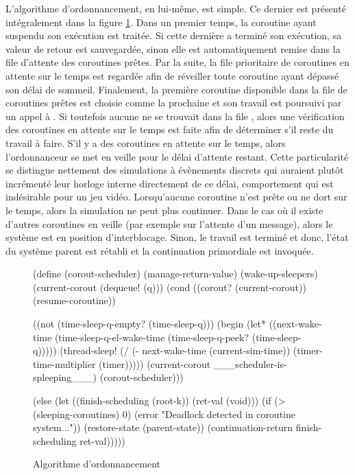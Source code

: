 \documentclass[12pt,twoside,letterpaper,francais]{book}
\newcommand{\scheme}[1]{\selectlanguage{english}{\tt #1}\selectlanguage{french}}
\begin{document}
L'algorithme d'ordonnancement, en lui-même, est simple. Ce dernier est
présenté intégralement dans la figure \ref{Corout:scheduler}. Dans un
premier temps, la coroutine ayant suspendu son exécution est
traitée. Si cette dernière a terminé son exécution, sa valeur de
retour est sauvegardée, sinon elle est automatiquement remise dans la
file d'attente des coroutines prêtes. Par la suite, la file
prioritaire de coroutines en attente sur le temps est regardée afin de
réveiller toute coroutine ayant dépassé son délai de
sommeil. Finalement, la première coroutine disponible dans la file de
coroutines prêtes est choisie comme la prochaine et son travail est
poursuivi par un appel à \scheme{resume-coroutine}. Si toutefois
aucune ne se trouvait dans la file \scheme{q}, alors une vérification
des coroutines en attente sur le temps est faite afin de déterminer
s'il reste du travail à faire. S'il y a des coroutines en attente sur
le temps, alors l'ordonnanceur se met en veille pour le délai
d'attente restant. Cette particularité se distingue nettement des
simulations à évènements discrets qui auraient plutôt incrémenté leur
horloge interne directement de ce délai, comportement qui est
indésirable pour un jeu vidéo. Lorsqu'aucune coroutine n'est prête ou
ne dort sur le temps, alors la simulation ne peut plus continuer. Dans
le cas où il existe d'autres coroutines en veille (par exemple sur
l'attente d'un message), alors le système est en position
d'interblocage. Sinon, le travail est terminé et donc, l'état du
système parent est rétabli et la continuation primordiale est
invoquée.\\

\begin{figure}[htb!]
  \begin{schemecode}
(define (corout-scheduler)
  (manage-return-value)
  (wake-up-sleepers)
  (current-corout (dequeue! (q)))
  (cond
   ((corout? (current-corout)) (resume-coroutine))

   ((not (time-sleep-q-empty? (time-sleep-q)))
    (begin
      (let* ((next-wake-time
              (time-sleep-q-el-wake-time 
                (time-sleep-q-peek? (time-sleep-q)))))
        (thread-sleep! (/ (- next-wake-time (current-sim-time))
                          (timer-time-multiplier (timer)))))
      (current-corout \_\_\_scheduler-is-spleeping\_\_\_)
      (corout-scheduler)))
      
   (else
    (let ((finish-scheduling (root-k))
          (ret-val (void)))
      (if (> (sleeping-coroutines) 0)
          (error "Deadlock detected in coroutine system..."))
      (restore-state (parent-state))
      (continuation-return finish-scheduling ret-val)))))
  \end{schemecode}
  \caption{Algorithme d'ordonnancement}
  \label{Corout:scheduler}
\end{figure}
\end{document}
